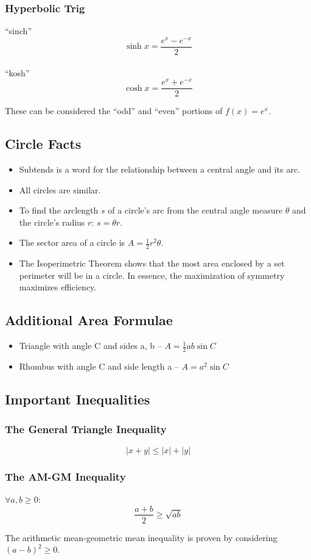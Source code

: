 \documentclass{article}
\begin{document}
\subsubsection{Hyperbolic Trig}
``sinch''
$$\sinh{x}=\frac{e^x-e^{-x}}{2}$$\\
``kosh''
$$\cosh{x}=\frac{e^x+e^{-x}}{2}$$

These can be considered the ``odd'' and ``even'' portions of $f(x)=e^x$.

\subsection{Circle Facts}
\begin{itemize}
    \item Subtends is a word for the relationship between a central angle and its arc.
    \item All circles are similar.
    \item To find the arclength $s$ of a circle's arc from the central angle measure $\theta$ and the circle's radius $r$: $s=\theta r$.
    \item The sector area of a circle is $A=\frac{1}{2}r^2\theta$.
    \item The Isoperimetric Theorem shows that the most area enclosed by a set perimeter will be in a circle. In essence, the maximization of symmetry maximizes efficiency.
\end{itemize}

\subsection{Additional Area Formulae}
\begin{itemize}
    \item Triangle with angle C and sides a, b -- $A=\frac{1}{2}ab\sin{C}$
    \item Rhombus with angle C and side length a -- $A=a^2\sin{C}$
\end{itemize}

\subsection{Important Inequalities}
\subsubsection{The General Triangle Inequality}
$$|x+y| \le |x| + |y|$$
\subsubsection{The AM-GM Inequality}
$\forall a,b \ge 0$:
$$\frac{a+b}{2}\ge\sqrt{ab}$$

The arithmetic mean-geometric mean inequality is proven by considering $(a-b)^2\ge0$.
\end{document}
